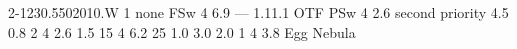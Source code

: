 \documentclass[12pt,a4]{article}
\begin{document}
 {2-1}{230.5}{50}{20}{10.}{W}
%
%
\HERAmap
 {1}    %
 {}     %
 {}     %
 {none} %
 {FSw}  %
 {4}    %
 {6.9}  %
 {---}  %
 {1.1}{1.1} {OTF}     {PSw}  {4}    {2.6}  {second priority}
%
%
%
%
\BOLOcompact
 {4.5}  %
 {0.8}  %
 {2}    %
 {4}    %
 {2.6}  %
 {1.5} {15} {4} {6.2}
%
\BOLOmap
 {25}         %
 {1.0}        %
 {3.0}        %
 {2.0}        %
 {1}          %
 {4}          %
 {3.8}        %
 {Egg Nebula} %
%
%
%
%
\end{document}
